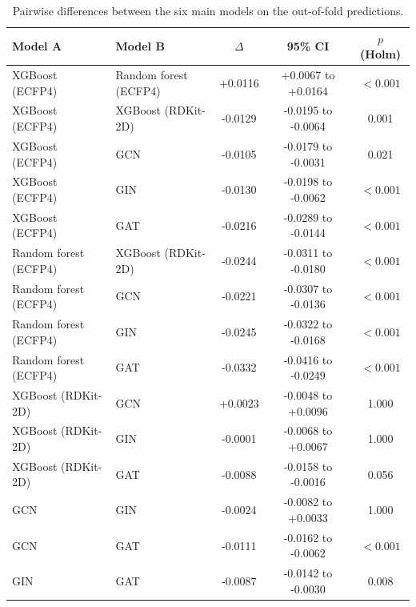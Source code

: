 \begin{table}[htbp]
\centering
\caption{Pairwise differences between the six main models on the out-of-fold predictions.}
\label{tab:si_pairwise}
\small
\setlength{\tabcolsep}{4pt}
\begin{tabular}{llccc}
\toprule
Model A & Model B & $\Delta$ & 95\% CI & $p$ (Holm) \\
\midrule
XGBoost (ECFP4) & Random forest (ECFP4) & +0.0116 & +0.0067 to +0.0164 & $<0.001$ \\
XGBoost (ECFP4) & XGBoost (RDKit-2D) & -0.0129 & -0.0195 to -0.0064 & 0.001 \\
XGBoost (ECFP4) & GCN & -0.0105 & -0.0179 to -0.0031 & 0.021 \\
XGBoost (ECFP4) & GIN & -0.0130 & -0.0198 to -0.0062 & $<0.001$ \\
XGBoost (ECFP4) & GAT & -0.0216 & -0.0289 to -0.0144 & $<0.001$ \\
Random forest (ECFP4) & XGBoost (RDKit-2D) & -0.0244 & -0.0311 to -0.0180 & $<0.001$ \\
Random forest (ECFP4) & GCN & -0.0221 & -0.0307 to -0.0136 & $<0.001$ \\
Random forest (ECFP4) & GIN & -0.0245 & -0.0322 to -0.0168 & $<0.001$ \\
Random forest (ECFP4) & GAT & -0.0332 & -0.0416 to -0.0249 & $<0.001$ \\
XGBoost (RDKit-2D) & GCN & +0.0023 & -0.0048 to +0.0096 & 1.000 \\
XGBoost (RDKit-2D) & GIN & -0.0001 & -0.0068 to +0.0067 & 1.000 \\
XGBoost (RDKit-2D) & GAT & -0.0088 & -0.0158 to -0.0016 & 0.056 \\
GCN & GIN & -0.0024 & -0.0082 to +0.0033 & 1.000 \\
GCN & GAT & -0.0111 & -0.0162 to -0.0062 & $<0.001$ \\
GIN & GAT & -0.0087 & -0.0142 to -0.0030 & 0.008 \\
\bottomrule
\end{tabular}
\end{table}
